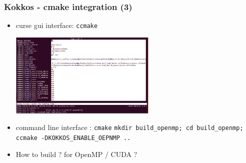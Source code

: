 \begin{frame}[fragile=singleslide]
  \frametitle{Kokkos - cmake integration (3)}

  \begin{itemize}
  \item curse gui interface: \texttt{ccmake}
    \begin{center}
      \includegraphics[width=7cm]{images/ccmake_kokkos}
    \end{center}
  \item command line interface : \texttt{cmake}
    \texttt{mkdir build\_openmp; cd build\_openmp; ccmake -DKOKKOS\_ENABLE\_OEPNMP ..}
  \item How to build ? for OpenMP / CUDA ?
  \end{itemize}

\end{frame}
  
